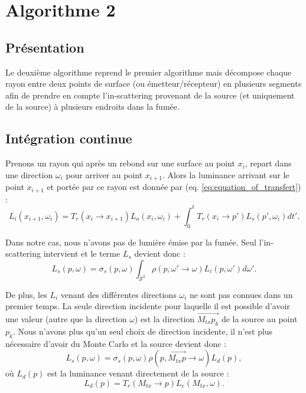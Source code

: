 \chapter{Algorithme 2}

\section{Présentation}

Le deuxième algorithme reprend le premier algorithme mais décompose chaque rayon entre deux points de surface (ou émetteur/récepteur) en plusieurs segments afin de prendre en compte l'in-scattering provenant de la source (et uniquement de la source) à plusieurs endroits dans la fumée.

\section{Intégration continue}

Prenons un rayon qui après un rebond sur une surface au point $x_i$, repart dans une direction $\omega_i$ pour arriver au point $x_{i+1}$. Alors la luminance arrivant sur le point $x_{i+1}$ et portée par ce rayon est donnée par (eq. \ref{eq:equation_of_transfert}) :
\large \begin{equation*}
    L_i(x_{i+1}, \omega_i) =
        T_r(x_i \longrightarrow x_{i+1})
        L_o(x_i, \omega_i)
        +
        \int_0^t
            T_r(x_i\longrightarrow p')
            L_s(p', \omega_i)
        dt'
.\end{equation*} \normalsize \newline\par

Dans notre cas, nous n'avons pas de lumière émise par la fumée. Seul l'in-scattering intervient et le terme $L_s$ devient donc :
\large \begin{equation*}
    L_s(p, \omega) =
        \sigma_s(p, \omega)
        \int_{\mathcal{S}^2}
            \rho(p, \omega' \longrightarrow \omega)
            L_i(p, \omega')
        d\omega'
.\end{equation*} \normalsize \par

De plus, les $L_i$ venant des différentes directions $\omega_i$ ne sont pas connues dans un premier temps. La seule direction incidente pour laquelle il est possible d'avoir une valeur (autre que la direction $\omega$) est la direction $\overrightarrow{M_{tx}p_k}$ de la source au point $p_k$. Nous n'avons plus qu'un seul choix de direction incidente, il n'est plus nécessaire d'avoir du Monte Carlo et la source devient donc :
\large \begin{equation} \label{eq:source_algo_1}
    L_s(p, \omega) =
        \sigma_{s}(p, \omega)
        \rho(p, \overrightarrow{M_{tx}p} \longrightarrow \omega)
        L_d(p)
,\end{equation} \normalsize
où $L_d(p)$ est la luminance venant directement de la source :
\large \begin{equation}
    L_d(p) = T_r(M_{tx} \longrightarrow p) L_e(M_{tx}, \omega)
.\end{equation} \normalsize

